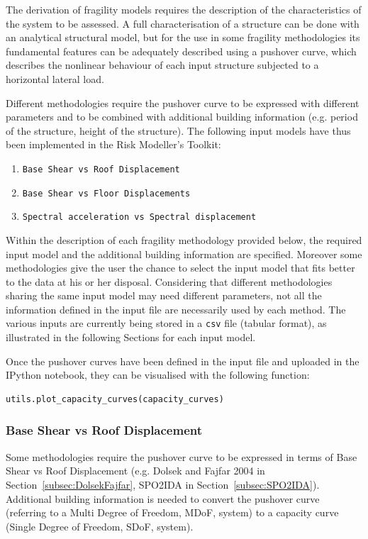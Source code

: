 The derivation of fragility models requires the description of the characteristics of the system to be assessed. A full characterisation of a structure can be done with an analytical structural model, but for the use in some fragility methodologies its fundamental features can be adequately described using a pushover curve, which describes the nonlinear behaviour of each input structure subjected to a horizontal lateral load.

Different methodologies require the pushover curve to be expressed with different parameters and to be combined with additional building information (e.g. period of the structure, height of the structure). The following input models have thus been implemented in the Risk Modeller's Toolkit:\\

\begin{enumerate}
 \item \verb=Base Shear vs Roof Displacement=
 \item \verb=Base Shear vs Floor Displacements=
 \item \verb=Spectral acceleration vs Spectral displacement=\\
\end{enumerate}

Within the description of each fragility methodology provided below, the required input model and the additional building information are specified. Moreover some methodologies give the user the chance to select the input model that fits better to the data at his or her disposal. Considering that different methodologies sharing the same input model may need different parameters, not all the information defined in the input file are necessarily used by each method. The various inputs are currently being stored in a \verb=csv= file (tabular format), as illustrated in the following Sections for each input model.

Once the pushover curves have been defined in the input file and uploaded in the IPython notebook, they can be visualised with the following function:

\begin{Verbatim}[frame=single, commandchars=\\\{\}, samepage=true]
utils.plot_capacity_curves(capacity_curves)
\end{Verbatim}


\subsubsection{Base Shear vs Roof Displacement}
\label{subsubsec:VB-Droof}
Some methodologies require the pushover curve to be expressed in terms of Base Shear vs Roof Displacement (e.g. Dolsek and Fajfar 2004 in Section~\ref{subsec:DolsekFajfar}, SPO2IDA in Section~\ref{subsec:SPO2IDA}). Additional building information is needed to convert the pushover curve (referring to a Multi Degree of Freedom, MDoF, system) to a capacity curve (Single Degree of Freedom, SDoF, system).\\

